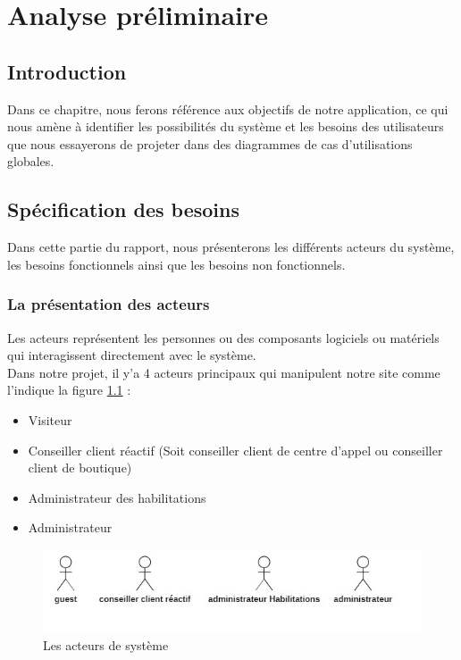 \chapter{Analyse préliminaire}

\section*{Introduction}
Dans ce chapitre, nous ferons référence aux objectifs de notre application, ce qui nous amène à identifier les possibilités du système et les besoins des utilisateurs que nous essayerons de projeter dans des diagrammes de cas d’utilisations globales.
    
\section[Spécification des besoins]{Spécification des besoins}
Dans cette partie du rapport, nous présenterons les différents acteurs du système, les besoins fonctionnels ainsi que les besoins non fonctionnels.
\subsection[La présentation des acteurs ]{La présentation des acteurs }
Les acteurs représentent les personnes ou des composants logiciels ou matériels qui interagissent directement avec le système.\\
Dans notre projet, il y’a 4 acteurs principaux qui manipulent notre site comme l'indique la figure \ref{fig:actors} :
\begin{itemize}
	\item Visiteur
	\item Conseiller client réactif (Soit conseiller client de centre d’appel ou conseiller client de boutique)
	\item Administrateur des habilitations
	\item Administrateur
\end{itemize}

\begin{figure}[tbph]
	\centering
	\includegraphics[width=0.7\linewidth]{img/conception/usecases/actors}
	\caption[Les acteurs de système]{Les acteurs de système}
	\label{fig:actors}
\end{figure}

